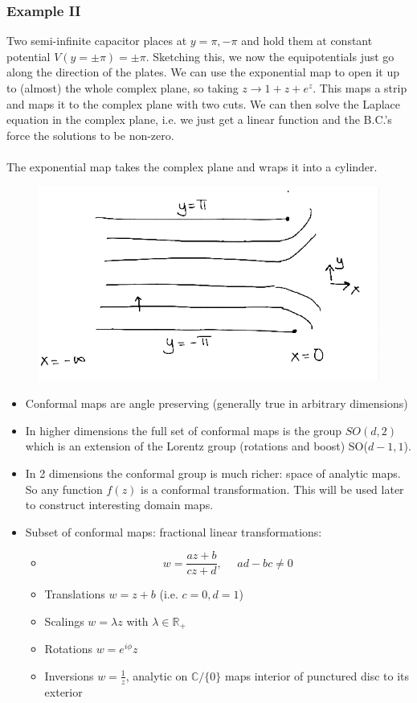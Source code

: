 \documentclass[a4paper,12pt]{article}
\begin{document}
\subsubsection{Example II}
Two semi-infinite capacitor places at $y={\pi,-\pi}$ and hold them at constant potential $V(y=\pm \pi)=\pm \pi$. Sketching this, we now the equipotentials just go along the direction of the plates. We can use the exponential map to open it up to (almost) the whole complex plane, so taking $z\to1+z+e^z$. This maps a strip and maps it to the complex plane with two cuts. We can then solve the Laplace equation in the complex plane, i.e. we just get a linear function and the B.C.'s force the solutions to be non-zero.\\\\
The exponential map takes the complex plane and wraps it into a cylinder.
\begin{figure}[H]
	\centering
	\includegraphics[width=0.7\linewidth]{5}
	\caption{}
	\label{fig:4}
\end{figure}
\begin{itemize}
\item Conformal maps are angle preserving (generally true in arbitrary dimensions)
\item In higher dimensions the full set of conformal maps is the group $SO(d,2)$ which is an extension of the Lorentz group (rotations and boost) SO($d-1,1$).
\item In 2 dimensions the conformal group is much richer: space of analytic maps. So any function $f(z)$ is a conformal transformation. This will be used later to construct interesting domain maps.
\item Subset of conformal maps: fractional linear transformations:
\begin{itemize}
	\item \begin{equation}
		w=\frac{az+b}{cz+d},~~~~~~ad-bc\neq0
	\end{equation}
	\item Translations $w=z+b$ (i.e. $c=0,d=1$)
	\item Scalings $w=\lambda z$ with $\lambda\in \mathds{R}_+$
	\item Rotations $w=e^{i\phi}z$
	\item Inversions $w=\frac{1}{z}$, analytic on $\mathds{C}/\{0\}$ maps interior of punctured disc to its exterior
 \end{itemize}
\end{itemize}
\end{document}
